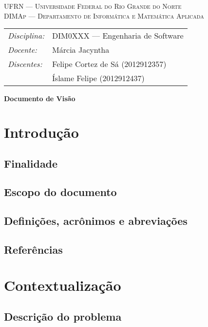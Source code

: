 \documentclass[12pt, a4paper]{article}
\begin{document}
    \begin{center}
      \textsc{UFRN --- Universidade Federal do Rio Grande do Norte} \\
      \textsc{DIMAp --- Departamento de Informática e Matemática Aplicada} \\
    \end{center}

    \bigskip

    \begin{tabular}{@{}ll@{}}
        \emph{Disciplina:} & DIM0XXX --- Engenharia de Software \\
        \emph{Docente:}    & Márcia Jacyntha \\
        \emph{Discentes:}  & Felipe Cortez de Sá \small{(2012912357)} \\
                           & Íslame Felipe \small{(2012912437)}
                           
    \end{tabular}

    \bigskip

    \begin{center}
      \Large\textbf{Documento de Visão}
    \end{center}

    \section{Introdução}
    \subsection{Finalidade}
    \subsection{Escopo do documento}
    \subsection{Definições, acrônimos e abreviações}
    \subsection{Referências}

    \section{Contextualização}
    \subsection{Descrição do problema}
\end{document}
